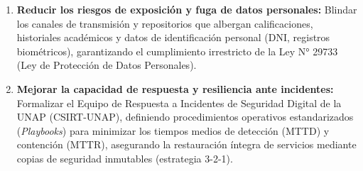 \begin{enumerate}[itemsep=2.5pt,topsep=2pt,parsep=0pt]
    \item \textbf{Reducir los riesgos de exposición y fuga de datos personales:} Blindar los canales de transmisión y repositorios que albergan calificaciones, historiales académicos y datos de identificación personal (DNI, registros biométricos), garantizando el cumplimiento irrestricto de la Ley N° 29733 (Ley de Protección de Datos Personales).

    \item \textbf{Mejorar la capacidad de respuesta y resiliencia ante incidentes:} Formalizar el Equipo de Respuesta a Incidentes de Seguridad Digital de la UNAP (CSIRT-UNAP), definiendo procedimientos operativos estandarizados (\textit{Playbooks}) para minimizar los tiempos medios de detección (MTTD) y contención (MTTR), asegurando la restauración íntegra de servicios mediante copias de seguridad inmutables (estrategia 3-2-1).
\end{enumerate}
